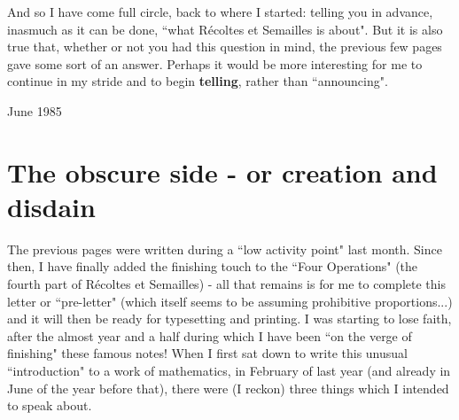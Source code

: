 And so I have come full circle, back to where I started: telling you in advance, inasmuch as it can be done, ``what R\'ecoltes et Semailles is about". But it is also true that, whether or not you had this question in mind, the previous few pages gave some sort of an answer. Perhaps it would be more interesting for me to continue in my stride and to begin \textbf{telling}, rather than ``announcing".
\begin{flushright} June 1985 \end{flushright} 

\section{The obscure side - or creation and disdain}

The previous pages were written during a ``low activity point" last month. Since then, I have finally added the finishing touch to the ``Four Operations" (the fourth part of R\'ecoltes et Semailles) - all that remains is for me to complete this letter or ``pre-letter" (which itself seems to be assuming prohibitive proportions...) and it will then be ready for typesetting and printing. I was starting to lose faith, after the almost year and a half during which I have been ``on the verge of finishing" these famous notes! When I first sat down to write this unusual ``introduction" to a work of mathematics, in February of last year (and already in June of the year before that), there were (I reckon) three things which I intended to speak about. 

